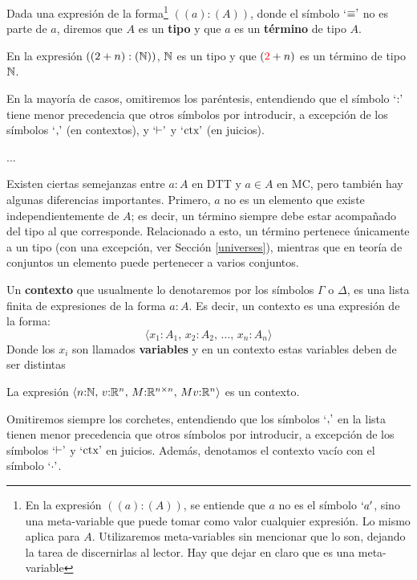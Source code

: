 \documentclass[../main.tex]{subfiles}
\begin{document}
\begin{definition}
    Dada una expresión de la forma\footnote{En la expresión $((a):(A))$, se entiende que $a$ no es el s\'imbolo {\color{red}$\lq a \rq$}, sino una meta-variable que puede tomar como valor cualquier expresión. Lo mismo aplica para $A$. Utilizaremos meta-variables sin mencionar que lo son, dejando la tarea de discernirlas  al lector. {\color{red} Hay que dejar en claro que es una meta-variable}} $((a):(A))$, donde el símbolo `${\equiv} \textrm'$ no es parte de $a$, diremos que $A$ es un \textbf{tipo} y que $a$ es un \textbf{término} de tipo $A$.
\end{definition}
\begin{example}
    En la expresión $((2+n):(\mathbb{N}))$, $\mathbb{N}$ es un tipo y que $({\color{red}2}+n)$ es un término de tipo $\mathbb{N}$.
\end{example}
\begin{notation}
    En la mayor\'ia de casos, omitiremos los paréntesis, entendiendo que el símbolo `${:}\textrm'$ tiene menor precedencia que otros símbolos por introducir, a excepción de los símbolos `${,}\textrm'$ (en contextos), y `${\vdash}\textrm'$ y  `${\textnormal{ctx}}\textrm'$ (en juicios).
\end{notation}
{\color{red}
\begin{definition}...
\end{definition}
}
Existen ciertas semejanzas entre $a:A$ en DTT y $a \in A$ en MC, pero también hay algunas diferencias importantes.
Primero, $a$ no es un elemento que existe independientemente de $A$; es decir, un término siempre debe estar acompañado del tipo al que corresponde.
Relacionado a esto, un término pertenece únicamente a un tipo (con una excepción, ver Sección \ref{universes}), mientras que en teoría de conjuntos un elemento puede pertenecer a varios conjuntos.

\begin{definition}
    Un \textbf{contexto} {\color{red} que usualmente lo denotaremos por  los s\'imbolos $\Gamma$ o $\Delta$}, es una lista  {\color{red} finita} de expresiones de la forma $a:A$. Es decir, un contexto es una expresión de la forma:
    {\color{red} $$\langle x_1{:}A_1,\,x_2{:}A_2,\, \dots,\, x_n{:}A_n\rangle$$}
    {\color{red} Donde los $x_i$ son llamados \textbf{variables} y en un contexto estas variables deben de ser distintas}
\end{definition}
\begin{example}
    La expresión $\langle n{:}\mathbb{N},\,v{:}\mathbb{R}^n,\,M{:}\mathbb{R}^{n\times n},\, Mv{:}\mathbb{R}^n \rangle$ es un contexto.
\end{example}
\begin{notation}
    Omitiremos siempre los corchetes, entendiendo que los símbolos `${,}\textrm'$ en la lista tienen menor precedencia que otros símbolos por introducir, a excepción de los símbolos `${\vdash}\textrm'$ y  `${\textnormal{ctx}}\textrm'$ en juicios. Además, denotamos el contexto vac\'io con el símbolo `$ {\cdot}\textrm\rq$.
\end{notation}
\end{document}
